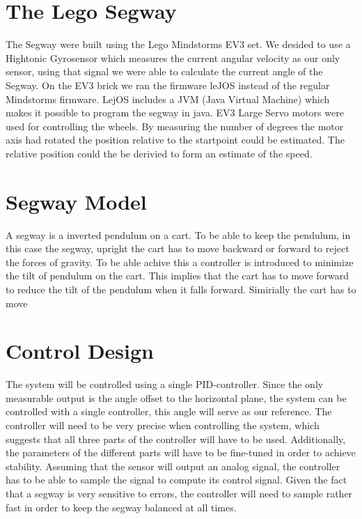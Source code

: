  \section{The Lego Segway}
 The Segway were built using the Lego Mindstorms EV3 set. We desided to use a Hightonic Gyrosensor which measures the current angular velocity as our only sensor, using that signal we were able to calculate the current angle of the Segway. On the EV3 brick we ran the firmware leJOS instead of the regular Mindstorms firmware. LejOS includes a JVM (Java Virtual Machine) which makes it possible to program the segway in java. EV3 Large Servo motors were used for controlling the wheels. By measuring the number of degrees the motor axis had rotated the position relative to the startpoint could be estimated. The relative position could the be derivied to form an estimate of the speed. 

\section{Segway Model}
A segway is a inverted pendulum on a cart. To be able to keep the pendulum, in this case the segway, upright the cart has to move backward or forward to reject the forces of gravity. To be able achive this a controller is introduced to minimize the tilt of pendulum on the cart. This implies that the cart has to move forward to reduce the tilt of the pendulum when it falls forward. Simirially the cart has to move

\section{Control Design}

The system will be controlled using a single PID-controller. Since the only measurable output is the angle offset to the horizontal plane, the system can be controlled with a single controller, this angle will serve as our reference. The controller will need to be very precise when controlling the system, which suggests that all three parts of the controller will have to be used. Additionally, the parameters of the different parts will have to be fine-tuned in order to achieve stability.
    Assuming that the sensor will output an analog signal, the controller has to be able to sample the signal to compute its control signal. Given the fact that a segway is very sensitive to errors, the controller will need to sample rather fast in order to keep the segway balanced at all times.

